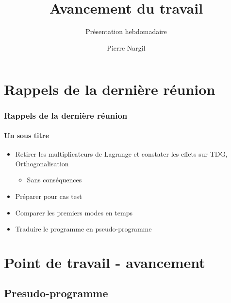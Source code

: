 \documentclass[12pt]{beamer}
\title{Avancement du travail}
\subtitle{Présentation hebdomadaire}
\author{Pierre Nargil}
\begin{document}

\frame{\titlepage}

\frame{\tableofcontents}

\section{Rappels de la dernière réunion}

\begin{frame}

\frametitle{Rappels de la dernière réunion}
\framesubtitle{Un sous titre}

\begin{itemize}
	\item Retirer les multiplicateurs de Lagrange et constater les effets sur TDG, Orthogonalisation
	\begin{itemize}
		\item Sans conséquences
	\end{itemize}
	\item Préparer pour cas test
	\item Comparer les premiers modes en temps
	\item Traduire le programme en pseudo-programme
\end{itemize}

\end{frame}

\section{Point de travail - avancement}
\subsection{Presudo-programme}
\end{document}
